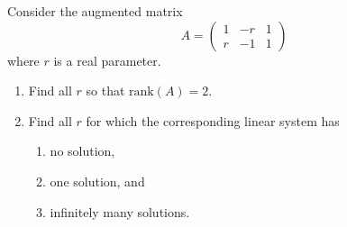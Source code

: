 \documentclass{ximera}
\begin{document}
\begin{exercise}  \label{A:2.4.2}
Consider the augmented matrix 
\[
	A=\left(\begin{array}{cc|c}  
 			1 & -r & 1\\  
 			r & -1 & 1  
	\end{array}\right)
\]
where $r$ is a real parameter. 
\begin{enumerate}
	\item Find all $r$ so that $\text{rank}(A)=2$.

	\item Find all $r$ for which the corresponding linear system has 	
	\begin{enumerate}
		\item no solution, 
		\item one solution, and 
		\item infinitely many solutions.
	\end{enumerate}
\end{enumerate}

\begin{solution}


\end{solution}
\end{exercise}
\end{document}
